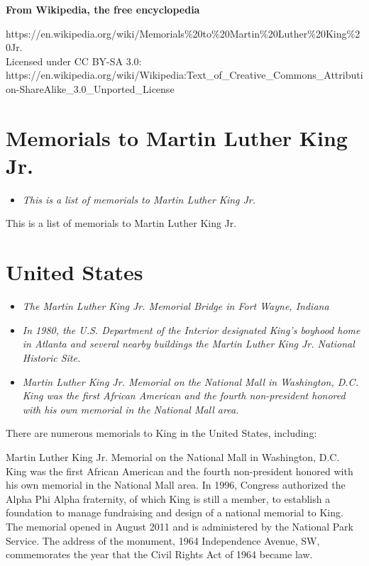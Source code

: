 \textbf{From Wikipedia, the free encyclopedia}

https://en.wikipedia.org/wiki/Memorials\%20to\%20Martin\%20Luther\%20King\%20Jr.\\
Licensed under CC BY-SA 3.0:\\
https://en.wikipedia.org/wiki/Wikipedia:Text\_of\_Creative\_Commons\_Attribution-ShareAlike\_3.0\_Unported\_License

\section{Memorials to Martin Luther King
Jr.}\label{memorials-to-martin-luther-king-jr.}

\begin{itemize}
\item
  \emph{This is a list of memorials to Martin Luther King Jr.}
\end{itemize}

This is a list of memorials to Martin Luther King Jr.

\section{United States}\label{united-states}

\begin{itemize}
\item
  \emph{The Martin Luther King Jr. Memorial Bridge in Fort Wayne,
  Indiana}
\item
  \emph{In 1980, the U.S. Department of the Interior designated King's
  boyhood home in Atlanta and several nearby buildings the Martin Luther
  King Jr. National Historic Site.}
\item
  \emph{Martin Luther King Jr. Memorial on the National Mall in
  Washington, D.C. King was the first African American and the fourth
  non-president honored with his own memorial in the National Mall
  area.}
\end{itemize}

There are numerous memorials to King in the United States, including:

Martin Luther King Jr. Memorial on the National Mall in Washington, D.C.
King was the first African American and the fourth non-president honored
with his own memorial in the National Mall area. In 1996, Congress
authorized the Alpha Phi Alpha fraternity, of which King is still a
member, to establish a foundation to manage fundraising and design of a
national memorial to King. The memorial opened in August 2011 and is
administered by the National Park Service. The address of the monument,
1964 Independence Avenue, SW, commemorates the year that the Civil
Rights Act of 1964 became law.

